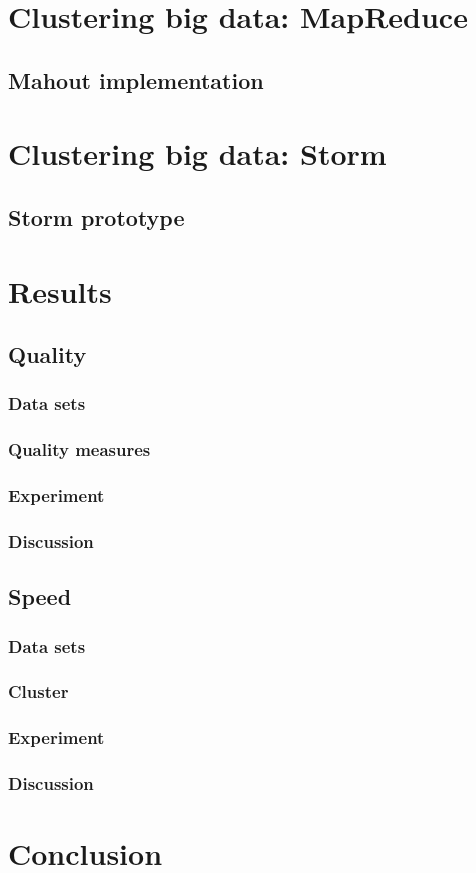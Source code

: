 \documentclass{article}
\begin{document}
\section{Clustering big data: MapReduce}

\subsection{Mahout implementation}

\section{Clustering big data: Storm}

\subsection{Storm prototype}

\section{Results}

\subsection{Quality}

\subsubsection{Data sets}

\subsubsection{Quality measures}

\subsubsection{Experiment}

\subsubsection{Discussion}

\subsection{Speed}

\subsubsection{Data sets}

\subsubsection{Cluster}

\subsubsection{Experiment}

\subsubsection{Discussion}

\section{Conclusion}
\end{document}
